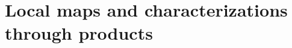 \chapter{Local maps and characterizations through products}\label{ch:local-characterizations}






